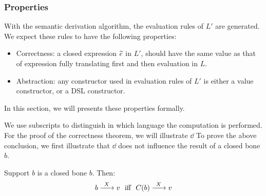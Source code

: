 \subsubsection{Properties}

With the semantic derivation algorithm, the evaluation rules of $L'$ are generated.
We expect these rules to have the following properties:
\begin{itemize}
  \item Correctness: a closed expression $\widetilde{e}$ in $L'$, should have the same value as 
         that of expression fully translating first and then evaluation in $L$.
  \item Abstraction: any constructor used in evaluation rules of $L'$ is either a value constructor,
         or a DSL constructor.
\end{itemize}
In this section, we will presents these properties formally.

We use subscripts to distinguish in which language the computation is performed.
For the proof of the correctness theorem, we will illustrate $\dd$ 
To prove the above conclusion, we first illustrate that $\dd$ does not influence the result of a closed bone $b$.

\begin{lemma}
  Support $b$ is a closed bone $b$. Then:
  \[ b \xrightarrow{~X~} v ~\text{ iff }~ C(b) \xrightarrow{~X~} v \]
\end{lemma}

